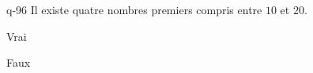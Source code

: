\begin{truefalse}{q-96}
Il existe quatre nombres premiers compris entre $10$ et $20$.
\item* Vrai
\item Faux
\end{truefalse}

